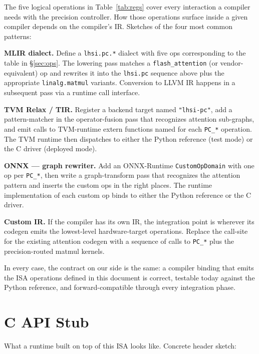 \documentclass[11pt]{article}
\begin{document}
The five logical operations in Table~\ref{tab:regs} cover every interaction
a compiler needs with the precision controller. How those operations
surface inside a given compiler depends on the compiler's IR. Sketches of
the four most common patterns:

\noindent\textbf{MLIR dialect.} Define a \texttt{lhsi.pc.*} dialect with
five ops corresponding to the table in \S\ref{sec:ops}. The lowering pass
matches a \texttt{flash\_attention} (or vendor-equivalent) op and rewrites
it into the \texttt{lhsi.pc} sequence above plus the appropriate
\texttt{linalg.matmul} variants. Conversion to LLVM IR happens in a
subsequent pass via a runtime call interface.

\noindent\textbf{TVM Relax / TIR.} Register a backend target named
\texttt{"lhsi-pc"}, add a pattern-matcher in the operator-fusion pass
that recognizes attention sub-graphs, and emit calls to TVM-runtime
extern functions named for each \texttt{PC\_*} operation. The TVM
runtime then dispatches to either the Python reference (test mode) or
the C driver (deployed mode).

\noindent\textbf{ONNX --- graph rewriter.} Add an ONNX-Runtime
\texttt{CustomOpDomain} with one op per \texttt{PC\_*}, then write a
graph-transform pass that recognizes the attention pattern and inserts
the custom ops in the right places. The runtime implementation of each
custom op binds to either the Python reference or the C driver.

\noindent\textbf{Custom IR.} If the compiler has its own IR, the
integration point is wherever its codegen emits the lowest-level
hardware-target operations. Replace the call-site for the existing
attention codegen with a sequence of calls to \texttt{PC\_*} plus the
precision-routed matmul kernels.

In every case, the contract on our side is the same: a compiler binding
that emits the ISA operations defined in this document is correct,
testable today against the Python reference, and forward-compatible
through every integration phase.

\section{C API Stub}
\label{sec:capi}

What a runtime built on top of this ISA looks like. Concrete header sketch:
\end{document}
